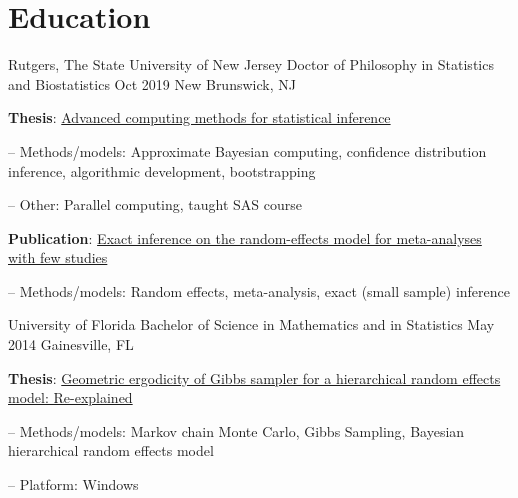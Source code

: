 \documentclass[letterpaper]{resume_config}
\begin{document}
\section{Education}

\EducationExperience
    {Rutgers, The State University of New Jersey}  
    {Doctor of Philosophy in Statistics and Biostatistics} 
    {Oct 2019}  
    {New Brunswick, NJ}  
    {\item {\bf Thesis}: \href{https://rucore.libraries.rutgers.edu/rutgers-lib/61966/}{Advanced computing methods for statistical inference} 
        \item[--] Methods/models: Approximate Bayesian computing, confidence distribution inference, algorithmic development, bootstrapping     
     	\item[--] Other: Parallel computing, taught SAS course   
     \item {\bf Publication}: \href{https://pubmed.ncbi.nlm.nih.gov/30430540/ }{Exact inference on the random-effects model for meta-analyses with few studies} 
     	\item[--] Methods/models: Random effects, meta-analysis, exact (small sample) inference  
    }

\EducationExperience
    {University of Florida}  
    {Bachelor of Science in Mathematics and in Statistics}  
    {May 2014}  
    {Gainesville, FL}  
    {\item {\bf Thesis}: \href{https://ufdc.ufl.edu/AA00057032/00001}{Geometric ergodicity of Gibbs sampler for a hierarchical random effects model: Re-explained}
     \item[--] Methods/models: Markov chain Monte Carlo, Gibbs Sampling, Bayesian hierarchical random effects model     
     \item[--]  Platform: Windows}

 
\end{document}
